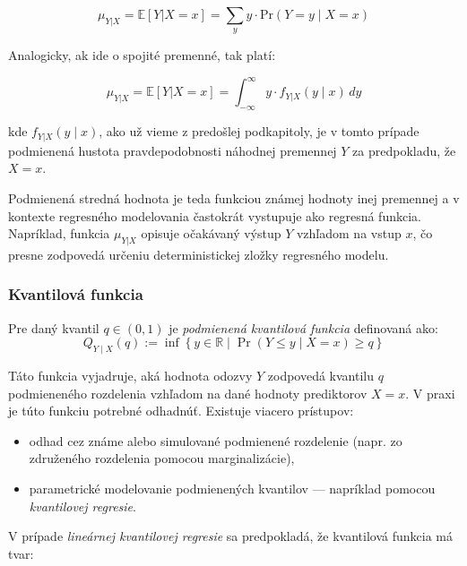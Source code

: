 \begin{equation}
\mu_{Y|X} = \mathbb{E}[Y|X = x] = \sum_{y} y \cdot \mathrm{Pr}(Y = y \mid X = x)
\end{equation}

Analogicky, ak ide o spojité premenné, tak platí:

\begin{equation}
\mu_{Y|X} = \mathbb{E}[Y|X = x] = \int_{-\infty}^{\infty} y \cdot f_{Y|X}(y \mid x) \, dy
\end{equation}

kde $f_{Y|X}(y \mid x)$, ako už vieme z predošlej podkapitoly, je v tomto prípade podmienená hustota pravdepodobnosti náhodnej premennej $Y$ za predpokladu, že $X = x$.

Podmienená stredná hodnota je teda funkciou známej hodnoty inej premennej a v kontexte regresného modelovania častokrát vystupuje ako regresná funkcia. Napríklad, funkcia $\mu_{Y|X}$ opisuje očakávaný výstup $Y$ vzhľadom na vstup $x$, čo presne zodpovedá určeniu deterministickej zložky regresného modelu.

\subsubsection{Kvantilová funkcia}
\label{subsubsec:conditional_quantile_function}

Pre daný kvantil $q \in (0,1)$ je \textit{podmienená kvantilová funkcia} definovaná ako:
\begin{equation}
Q_{Y \mid X}(q) := \inf \left\{ y \in \mathbb{R} \mid \Pr(Y \leq y \mid X = x) \geq q \right\}
\end{equation}

Táto funkcia vyjadruje, aká hodnota odozvy $Y$ zodpovedá kvantilu $q$ podmieneného rozdelenia vzhľadom na dané hodnoty prediktorov $X = x$. V praxi je túto funkciu potrebné odhadnúť. Existuje viacero prístupov:

\begin{itemize}
  \item odhad cez známe alebo simulované podmienené rozdelenie (napr. zo združeného rozdelenia pomocou marginalizácie),
  \item parametrické modelovanie podmienených kvantilov — napríklad pomocou \textit{kvantilovej regresie}.
\end{itemize}

\medskip
V prípade \textit{lineárnej kvantilovej regresie} sa predpokladá, že kvantilová funkcia má tvar:


